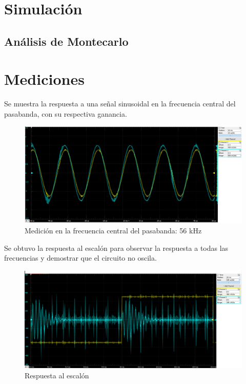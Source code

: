 \documentclass[../../tc_tp5_main.tex]{subfiles}
\begin{document}
 	 \section{Simulación}
	\subsection{Análisis de Montecarlo}
 	 
 	 \section{Mediciones}
 	 
 	 Se muestra la respuesta a una señal sinusoidal en la frecuencia central del pasabanda, con su respectiva ganancia.
 	\begin{figure}[H]	%
	\centering
	\includegraphics[scale=0.5]{imagenes/frec_corte_posta.png}
	\caption{Medición en la frecuencia central del pasabanda: 56 kHz}
	\label{fig:ej2_frec_corte_posta}
	\end{figure}
	
	Se obtuvo la respuesta al escalón para observar la respuesta a todas las frecuencias y demostrar que el circuito no oscila.
	
 	\begin{figure}[H]	%
	\centering
	\includegraphics[scale=0.5]{imagenes/resp_esc.png}
	\caption{Respuesta al escalón}
	\label{fig:ej2_resp_escalon}
	\end{figure}
	
\end{document}
